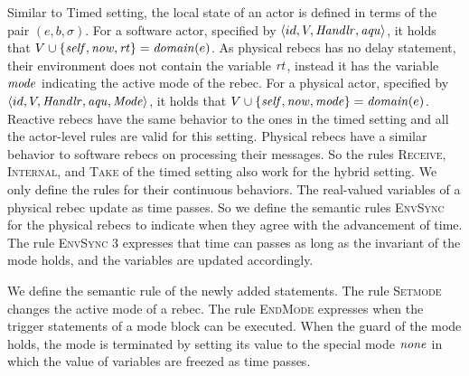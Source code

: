 Similar to Timed setting, the local state of an actor is defined in terms of the pair $(e,b,\sigma)$. %
For a software actor, specified by $\langle id, V,\mathit{Handlr},\mathit{aqu}\rangle$, %
it holds that $V\cup\{\mathit{self},\mathit{now},\mathit{rt}\}=\mathit{domain}(e)$. As physical rebecs has no delay statement, their environment does not contain the variable $\mathit{rt}$, instead it has the variable $\mathit{mode}$ indicating the active mode of the rebec. %
For a physical actor, specified by $\langle id, V,\mathit{Handlr},\mathit{aqu}, {\it Mode}\rangle$, %
it holds that $V\cup\{\mathit{self},\mathit{now},\mathit{mode}\}=\mathit{domain}(e)$. Reactive rebecs have the same behavior to the ones in the timed setting and all the actor-level rules are valid for this setting. Physical rebecs have a similar behavior to software rebecs on processing their messages. So the rules \textsc{Receive}, \textsc{Internal}, and \textsc{Take} of the timed setting also work for the hybrid setting. We only define the rules for their continuous behaviors. The real-valued variables of a physical rebec update as time passes. So we define the semantic rules \textsc{EnvSync} for the physical rebecs to indicate when they agree with the advancement of time. The rule \textsc{EnvSync 3} expresses that time can passes as long as the invariant of the mode holds, and the variables are updated accordingly.

We define the semantic rule of the newly added statements. The rule \textsc{Setmode} changes the active mode of a rebec. The rule \textsc{EndMode} expresses when the trigger statements of a mode block can be executed. When the guard of the mode holds, the mode is terminated by setting its value to the special mode $\it none$ in which the value of variables are freezed as time passes.%


